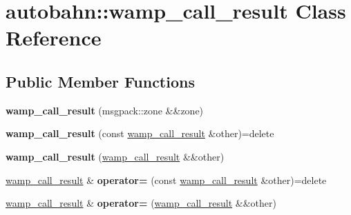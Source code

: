 \hypertarget{classautobahn_1_1wamp__call__result}{}\section{autobahn\+:\+:wamp\+\_\+call\+\_\+result Class Reference}
\label{classautobahn_1_1wamp__call__result}
\subsection*{Public Member Functions}
\begin{DoxyCompactItemize}
\item 
{\bfseries wamp\+\_\+call\+\_\+result} (msgpack\+::zone \&\&zone)\hypertarget{classautobahn_1_1wamp__call__result_a65a4b071b336da6f5951b2ae403f3a1c}{}\label{classautobahn_1_1wamp__call__result_a65a4b071b336da6f5951b2ae403f3a1c}

\item 
{\bfseries wamp\+\_\+call\+\_\+result} (const \hyperlink{classautobahn_1_1wamp__call__result}{wamp\+\_\+call\+\_\+result} \&other)=delete\hypertarget{classautobahn_1_1wamp__call__result_a6c8e35705f10a33813675093983b7747}{}\label{classautobahn_1_1wamp__call__result_a6c8e35705f10a33813675093983b7747}

\item 
{\bfseries wamp\+\_\+call\+\_\+result} (\hyperlink{classautobahn_1_1wamp__call__result}{wamp\+\_\+call\+\_\+result} \&\&other)\hypertarget{classautobahn_1_1wamp__call__result_a63db57d0c3cfede18b846fe96978f202}{}\label{classautobahn_1_1wamp__call__result_a63db57d0c3cfede18b846fe96978f202}

\item 
\hyperlink{classautobahn_1_1wamp__call__result}{wamp\+\_\+call\+\_\+result} \& {\bfseries operator=} (const \hyperlink{classautobahn_1_1wamp__call__result}{wamp\+\_\+call\+\_\+result} \&other)=delete\hypertarget{classautobahn_1_1wamp__call__result_a91659e31768ae1f6446875c89bfcde23}{}\label{classautobahn_1_1wamp__call__result_a91659e31768ae1f6446875c89bfcde23}

\item 
\hyperlink{classautobahn_1_1wamp__call__result}{wamp\+\_\+call\+\_\+result} \& {\bfseries operator=} (\hyperlink{classautobahn_1_1wamp__call__result}{wamp\+\_\+call\+\_\+result} \&\&other)\hypertarget{classautobahn_1_1wamp__call__result_adb80a04a0f0b97db0294fe1e489c8eae}{}\label{classautobahn_1_1wamp__call__result_adb80a04a0f0b97db0294fe1e489c8eae}


\end{DoxyCompactItemize}
